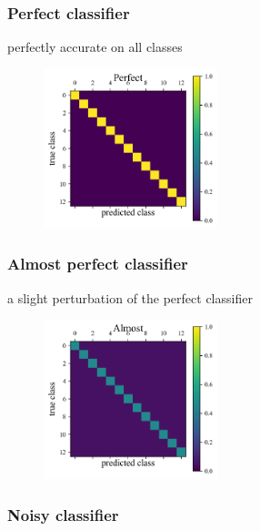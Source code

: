 \subsubsection{Perfect classifier}
\label{sec:perfect_data}

perfectly accurate on all classes

\begin{figure}
	\begin{center}
		\includegraphics[width=0.45\textwidth]{./fig/Perfect.png}\\
		\caption{}
		\label{fig:perfect_data}
	\end{center}
\end{figure}

\subsubsection{Almost perfect classifier}
\label{sec:almost_data}

a slight perturbation of the perfect classifier

\begin{figure}
	\begin{center}
		\includegraphics[width=0.45\textwidth]{./fig/Almost.png}\\
		\caption{}
		\label{fig:almost_data}
	\end{center}
\end{figure}

\subsubsection{Noisy classifier}
\label{sec:nois_datay}


